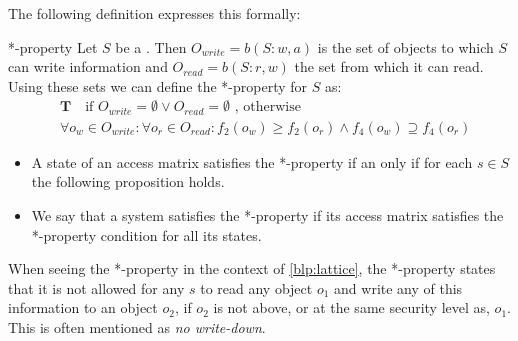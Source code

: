 The following definition expresses this formally:
\begin{definition}{*-property}
Let $S$ be a \principal{}.
Then $O_{write} = b(S: w, a)$ is the set of objects to which $S$ can write information and $O_{read} = b(S: r,w)$ the set from which it can read.
Using these sets we can define the *-property for $S$ as:
\begin{align*}
  &\textbf{T} \quad \text{if }O_{write} = \emptyset \vee O_{read} = \emptyset \text{ , otherwise }\\
  &\forall o_w \in O_{write}: \forall o_r \in O_{read}: f_2(o_w) \geq f_2(o_r) \wedge f_4(o_w) \supseteq f_4(o_r)
\end{align*}

\begin{itemize}
  \item A state of an access matrix satisfies the *-property if an only if for each $s \in S$ the following proposition holds.
  \item We say that a system satisfies the *-property if its access matrix satisfies the *-property condition for all its states.
\end{itemize}
\end{definition}

When seeing the *-property in the context of \cref{blp:lattice}, the *-property states that it is not allowed for any \ssubject{} $s$ to read any object $o_1$ and write any of this information to an object $o_2$, if $o_2$ is not above, or at the same security level as, $o_1$.
This is often mentioned as \emph{no write-down}.
